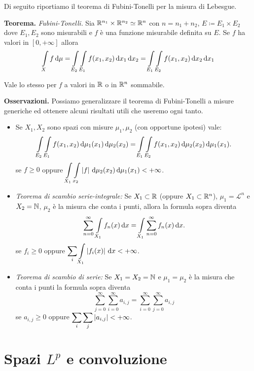 \documentclass[a4paper, 12pt]{report}
\begin{document}
Di seguito riportiamo il teorema di Fubini-Tonelli per la misura di Lebesgue.

\textbf{Teorema.}
\textit{Fubini-Tonelli.}
Sia $\mathbb R^{n_1} \times \mathbb R^{n_2} \simeq \mathbb R^n$ con $n = n_1 + n_2$, $ E \coloneqq E_1 \times E_2 $ dove $E_1, E_2$ sono misurabili e $f$ è una funzione misurabile definita su $E$.
Se $f$ ha valori in $[0,+\infty]$ allora
$$
\int\limits_X f \dd \mu 
= \int\limits_{\mathclap{E_2}} \int\limits_{\mathclap{E_1}} f(x_1,x_2) \dd x_1 \dd x_2 
= \int\limits_{\mathclap{E_1}} \int\limits_{\mathclap{E_2}} f(x_1,x_2) \dd x_2 \dd x_1
$$ 

Vale lo stesso per $f$ a valori in $\mathbb R$ o in $\mathbb R^n$ sommabile.

\textbf{Osservazioni.}
Possiamo generalizzare il teorema di Fubini-Tonelli a misure generiche ed ottenere alcuni risultati utili che useremo ogni tanto.
\begin{itemize}
	\item Se $X_1, X_2$ sono spazi con misure $\mu_1,\mu_2$ (con opportune ipotesi) vale:
		$$
		\int\limits_{\mathclap{E_2}} \int\limits_{\mathclap{E_1}} f(x_1,x_2) \dd \mu_1(x_1)  \dd \mu_2(x_2) 
		= \int\limits_{\mathclap{E_1}} \int\limits_{\mathclap{E_2}} f(x_1,x_2) \dd \mu_2(x_2)  \dd \mu_1(x_1).
		$$ 
		se $f\geq 0$ oppure $\ds \int\limits_{\mathclap{X_1}} \int\limits_{\mathclap{x_2}} \left| f \right| \dd \mu_2(x_2)  \dd \mu_1(x_1) < + \infty $.
	
	\item \textit{Teorema di scambio serie-integrale:} Se $X_1 \subset \mathbb R$ (oppure $X_1 \subset \mathbb R^n$), $\mu_1 = \mathscr L^n$ e $X_2 = \mathbb N$, $\mu_2$ è la misura che conta i punti, allora la formula sopra diventa
		$$
		\sum_{n=0}^{\infty} \, \int\limits_{\mathclap{X_1}} f_n(x) \dd x  
		= \int\limits_{\mathclap{X_1}} \sum_{n=0}^{\infty} f_n(x)  \dd x.
		$$ 
		se $f_i \geq 0$ oppure $\ds \sum_{i} \int\limits_{\mathclap{X_1}} \left| f_i(x) \right| \dd x  < + \infty $.
	
	\item \textit{Teorema di scambio di serie:} Se $X_1 = X_2 = \mathbb N$ e $\mu_1 = \mu_2$ è la misura che conta i punti la formula sopra diventa
		$$
		\sum_{j=0}^{\infty} \sum_{i=0}^{\infty} a_{i,j}  
		= \sum_{i=0}^{\infty} \sum_{j=0}^{\infty} a_{i,j} 
		$$ 
		se $a_{i,j} \geq 0$ oppure $\displaystyle \sum_{i} \sum_{j} \left| a_{i,j} \right| < +\infty $.
\end{itemize}

\chapter{Spazi $L^p$ e convoluzione}
\end{document}
